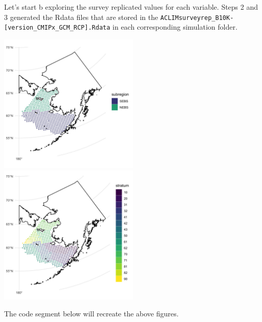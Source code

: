 \documentclass[
]{article}
\begin{document}
Let's start b exploring the survey replicated values for each variable.
Steps 2 and 3 generated the Rdata files that are stored in the
\texttt{ACLIMsurveyrep\_B10K-{[}version\_CMIPx\_GCM\_RCP{]}.Rdata} in
each corresponding simulation folder.

\includegraphics[width=0.5\textwidth,height=\textheight]{Figs/stations_NS.jpg}
\includegraphics[width=0.5\textwidth,height=\textheight]{Figs/stations.jpg}

The code segment below will recreate the above figures.
\end{document}
